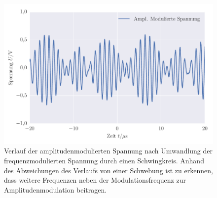 
\FloatBarrier\begin{figure}[!h]
\centering
\includegraphics[scale=1]{../Grafiken/Frequenz_Moduliert_Demodulation_Amplitude.pdf}
\caption{Verlauf der amplitudenmodulierten Spannung nach Umwandlung der frequenzmodulierten Spannung durch
	einen Schwingkreis. Anhand des Abweichungen des Verlaufs von einer Schwebung ist zu erkennen, 
	dass weitere Frequenzen neben der Modulationsfrequenz zur Amplitudenmodulation beitragen.   \label{fig:frequenz_moduliert_demodulation_amplitude}}
\end{figure}
\FloatBarrier